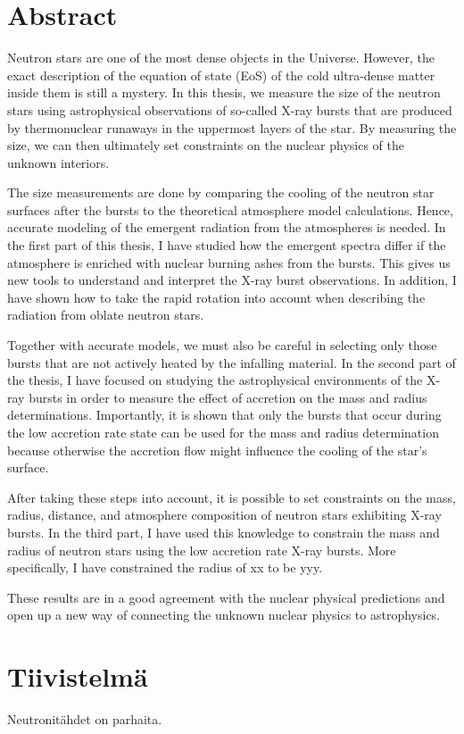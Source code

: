 \chapter*{Abstract}

Neutron stars are one of the most dense objects in the Universe.
However, the exact description of the equation of state (EoS) of the cold ultra-dense matter inside them is still a mystery.
In this thesis, we measure the size of the neutron stars using astrophysical observations of so-called X-ray bursts that are produced by thermonuclear runaways in the uppermost layers of the star.
By measuring the size, we can then ultimately set constraints on the nuclear physics of the unknown interiors.

The size measurements are done by comparing the cooling of the neutron star surfaces after the bursts to the theoretical atmosphere model calculations.
Hence, accurate modeling of the emergent radiation from the atmospheres is needed.
In the first part of this thesis, I have studied how the emergent spectra differ if the atmosphere is enriched with nuclear burning ashes from the bursts.
This gives us new tools to understand and interpret the X-ray burst observations.
In addition, I have shown how to take the rapid rotation into account when describing the radiation from oblate neutron stars.

Together with accurate models, we must also be careful in selecting only those bursts that are not actively heated by the infalling material.
In the second part of the thesis, I have focused on studying the astrophysical environments of the X-ray bursts in order to measure the effect of accretion on the mass and radius determinations.
Importantly, it is shown that only the bursts that occur during the low accretion rate state can be used for the mass and radius determination because otherwise the accretion flow might influence the cooling of the star's surface.

After taking these steps into account, it is possible to set constraints on the mass, radius, distance, and atmosphere composition of neutron stars exhibiting X-ray bursts.
In the third part, I have used this knowledge to constrain the mass and radius of neutron stars using the low accretion rate X-ray bursts.
More specifically, I have constrained the radius of xx to be yyy.


These results are in a good agreement with the nuclear physical predictions and open up a new way of connecting the unknown nuclear physics to astrophysics.






\vspace{2.0cm}
\chapter*{Tiivistelmä}
Neutronitähdet on parhaita.
